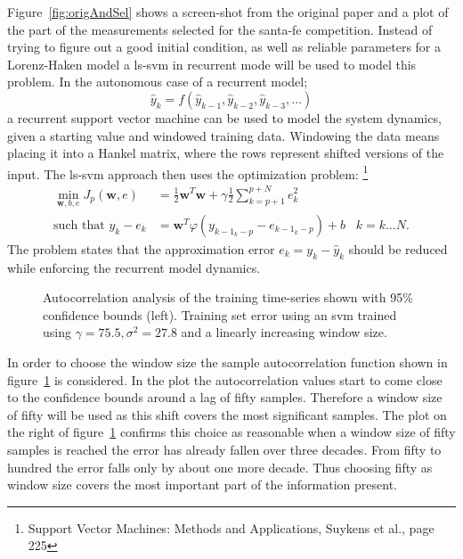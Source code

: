 Figure~\ref{fig:origAndSel} shows a screen-shot from the original paper and a plot of the part of the measurements selected for the santa-fe competition. Instead of trying to figure out a good initial condition, as well as reliable parameters for a Lorenz-Haken model a ls-svm in recurrent mode will be used to model this problem.
In the autonomous case of a recurrent model;
\begin{equation}
\hat{y}_k = f(\hat{y}_{k-1}, \hat{y}_{k-2}, \hat{y}_{k-3}, \dots)
\end{equation} 
a recurrent support vector machine can be used to model the system dynamics, given a starting value and windowed training data. Windowing the data means placing it into a Hankel matrix, where the rows represent shifted versions of the input. The ls-svm approach then uses the optimization problem: \footnote{Support Vector Machines: Methods and Applications, Suykens et al., page 225}
\begin{align}
\min\limits_{\mathbf{w},b,e} J_p(\mathbf{w},e) &= \frac{1}{2}\mathbf{w}^T \mathbf{w} + \gamma \frac{1}{2}\sum\limits_{k = p+1}^{p+N} e_k^2 \\
\text{such that } y_k - e_k &= \mathbf{w}^T \varphi(y_{k-1_k-p} - e_{k-1_k-p}) + b \;\;\; k = k \dots N.
\end{align}
The problem states that the approximation error $e_k  = y_k - \hat{y}_k$ should be reduced while enforcing the recurrent model dynamics. \\
\begin{figure}
\centering


\caption{Autocorrelation analysis of the training time-series shown with 95\% confidence bounds (left). Training set error using an svm trained using $\gamma = 75.5, \sigma^2 = 27.8$ and a linearly increasing window size.}
\label{fig:santaFeAutocorr}
\end{figure}
In order to choose the window size the sample autocorrelation function shown in figure~\ref{fig:santaFeAutocorr} is considered. In the plot the autocorrelation values start to come close to the confidence bounds around a lag of fifty samples. Therefore a window size of fifty will be used as this shift covers the most significant samples. The plot on the right of figure~\ref{fig:santaFeAutocorr} confirms this choice as reasonable when a window size of fifty samples is reached the error has already fallen over three decades. From fifty to hundred the error falls only by about one more decade. Thus choosing fifty as window size covers the most important part of the information present. \\
